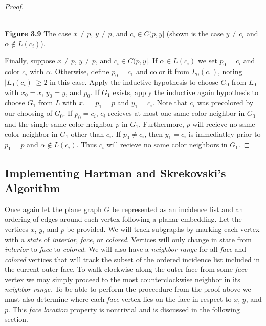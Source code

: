 \documentclass[11pt,letter]{article}
\begin{document}
\begin{proof}
\begin{center}
\hfill\\
\textbf{Figure 3.9} The case $x\ne p$, $y\ne p$, and $c_i\in C(p,y]$ (shown is the case $y\ne c_i$ and
$\alpha\not\in L(c_i)$).
\end{center}

\noindent Finally, suppose $x\ne p$, $y\ne p$, and $c_i\in C(p,y]$. If
$\alpha\in L(c_i)$ we set $p_0=c_i$ and color $c_i$ with $\alpha$. Otherwise, define $p_0=c_1$ and color it from
$L_0(c_1)$, noting $|L_0(c_i)|\ge 2$ in this case. Apply the inductive hypothesis to
choose $G_0$ from $L_0$ with $x_0=x$, $y_0=y$, and $p_0$. If $G_1$ exists, apply the inductive again
hypothesis to choose $G_1$ from $L$ with $x_1=p_1=p$ and $y_1=c_i$. Note that $c_i$ was precolored by our
choosing of $G_0$. If $p_0=c_i$, $c_i$ recieves at most one same
color neighbor in $G_0$ and the single same color neighbor $p$ in $G_1$. Furthermore, $p$ will recieve no
same color neighbor in $G_1$ other than $c_i$. If $p_0\ne c_i$, then $y_1=c_i$ is immediatley prior to
$p_1=p$ and $\alpha\not\in L(c_i)$. Thus $c_i$ will recieve no same color neighbors in $G_1$.
\end{proof}

\subsection*{Implementing Hartman and Skrekovski's Algorithm}

Once again let the plane graph $G$ be represented as an incidence list and an ordering of edges around each
vertex following a planar embedding. Let the vertices $x$, $y$, and $p$ be provided. We will track subgraphs by
marking each vertex with a \emph{state} of \emph{interior},
\emph{face}, or \emph{colored}. Vertices will only change in state from \emph{interior} to \emph{face} to
\emph{colored}. We will also have a \emph{neighbor range} for all \emph{face} and \emph{colored} vertices
that will track the subset of the ordered incidence list included in the current outer face. To walk clockwise
along the outer face from some \emph{face} vertex we may simply proceed to the most counterclockwise neighbor in
its \emph{neighbor range}. To be able to perform the proceedure from the proof above
we must also determine where each \emph{face} vertex lies on the face in respect to $x$, $y$, and $p$. This
\emph{face location} property is nontrivial and is discussed in the following section.\\
\end{document}
